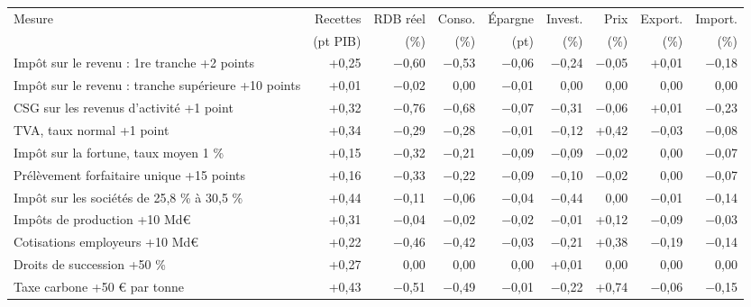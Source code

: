 \begin{tabular}{p{5.0cm}rrrrrrrr}
\toprule
Mesure & Recettes & RDB réel & Conso. & Épargne & Invest. & Prix & Export. & Import. \\
 & (pt PIB) & (\%) & (\%) & (pt) & (\%) & (\%) & (\%) & (\%) \\
\midrule
Impôt sur le revenu : 1re tranche +2 points & +0{,}25 & $-$0{,}60 & $-$0{,}53 & $-$0{,}06 & $-$0{,}24 & $-$0{,}05 & +0{,}01 & $-$0{,}18 \\
Impôt sur le revenu : tranche supérieure +10 points & +0{,}01 & $-$0{,}02 & 0{,}00 & $-$0{,}01 & 0{,}00 & 0{,}00 & 0{,}00 & 0{,}00 \\
CSG sur les revenus d'activité +1 point & +0{,}32 & $-$0{,}76 & $-$0{,}68 & $-$0{,}07 & $-$0{,}31 & $-$0{,}06 & +0{,}01 & $-$0{,}23 \\
TVA, taux normal +1 point & +0{,}34 & $-$0{,}29 & $-$0{,}28 & $-$0{,}01 & $-$0{,}12 & +0{,}42 & $-$0{,}03 & $-$0{,}08 \\
Impôt sur la fortune, taux moyen 1 \% & +0{,}15 & $-$0{,}32 & $-$0{,}21 & $-$0{,}09 & $-$0{,}09 & $-$0{,}02 & 0{,}00 & $-$0{,}07 \\
Prélèvement forfaitaire unique +15 points & +0{,}16 & $-$0{,}33 & $-$0{,}22 & $-$0{,}09 & $-$0{,}10 & $-$0{,}02 & 0{,}00 & $-$0{,}07 \\
Impôt sur les sociétés de 25,8 \% à 30,5 \% & +0{,}44 & $-$0{,}11 & $-$0{,}06 & $-$0{,}04 & $-$0{,}44 & 0{,}00 & $-$0{,}01 & $-$0{,}14 \\
Impôts de production +10 Md€ & +0{,}31 & $-$0{,}04 & $-$0{,}02 & $-$0{,}02 & $-$0{,}01 & +0{,}12 & $-$0{,}09 & $-$0{,}03 \\
Cotisations employeurs +10 Md€ & +0{,}22 & $-$0{,}46 & $-$0{,}42 & $-$0{,}03 & $-$0{,}21 & +0{,}38 & $-$0{,}19 & $-$0{,}14 \\
Droits de succession +50 \% & +0{,}27 & 0{,}00 & 0{,}00 & 0{,}00 & +0{,}01 & 0{,}00 & 0{,}00 & 0{,}00 \\
Taxe carbone +50 € par tonne & +0{,}43 & $-$0{,}51 & $-$0{,}49 & $-$0{,}01 & $-$0{,}22 & +0{,}74 & $-$0{,}06 & $-$0{,}15 \\
\bottomrule
\end{tabular}
